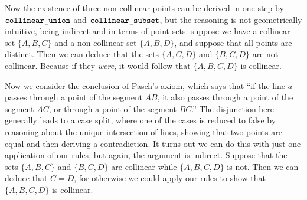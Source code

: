 Now the existence of three non-collinear points can be derived in one step by $\texttt{collinear\_union}$ and $\texttt{collinear\_subset}$, but the reasoning is not geometrically intuitive, being indirect and in terms of point-sets: suppose we have a collinear set $\{A, B, C\}$ and a non-collinear set $\{A, B, D\}$, and suppose that all points are distinct. Then we can deduce that the sets $\{A, C, D\}$ and $\{B, C, D\}$ are not collinear. Because if they \emph{were}, it would follow that $\{A, B, C, D\}$ is collinear. 

Now we consider the conclusion of Pasch's axiom, which says that ``if the line $a$ passes through a point of the segment $AB$, it also passes through a point of the segment $AC$, or through a point of the segment $BC$.'' The disjunction here generally leads to a case split, where one of the cases is reduced to false by reasoning about the unique intersection of lines, showing that two points are equal and then deriving a contradiction. It turns out we can do this with just one application of our rules, but again, the argument is indirect. Suppose that the sets $\{A, B, C\}$ and $\{B, C, D\}$ are collinear while $\{A, B, C, D\}$ is not. Then we can deduce that $C = D$, for otherwise we could apply our rules to show that $\{A, B, C, D\}$ is collinear.

